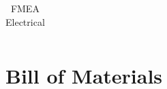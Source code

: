 \documentclass[hidelinks, twoside]{report}
\begin{document}
\begin{appendices}
\begin{table}
\begin{tabular}{@{}p{2cm}p{2cm}p{3cm}p{1cm}p{3cm}p{3cm}@{}}
     \bottomrule
  \end{tabular}
  \caption{FMEA Electrical}
  \label{table:fmea-electrical}
\end{table}

\chapter{Bill of Materials}
        \label{app:bom}
        
\end{appendices}
\end{document}
